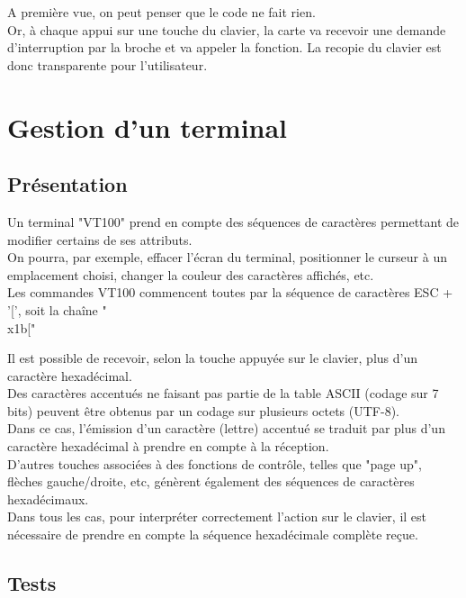 A première vue, on peut penser que le code ne fait rien.\\
Or, à chaque appui sur une touche du clavier, la carte va recevoir une demande d'interruption par la broche  et va appeler la fonction. La recopie du clavier est donc transparente pour l'utilisateur.

\chapter{Gestion d'un terminal}

\section{Présentation}

Un terminal "VT100" prend en compte des séquences de caractères permettant de modifier certains de ses attributs.\\
On pourra, par exemple, effacer l'écran du terminal, positionner le curseur à un emplacement choisi, changer la couleur des caractères affichés, etc.\\
Les commandes VT100 commencent toutes par la séquence de caractères ESC + '[', soit la chaîne "\\x1b["

Il est possible de recevoir, selon la touche appuyée sur le clavier, plus d'un caractère hexadécimal.\\
Des caractères accentués ne faisant pas partie de la table ASCII (codage sur 7 bits) peuvent être obtenus par un codage sur plusieurs octets (UTF-8).\\
Dans ce cas, l'émission d'un caractère (lettre) accentué se traduit par plus d'un caractère hexadécimal à prendre en compte à la réception.\\
D'autres touches associées à des fonctions de contrôle, telles que "page up", flèches gauche/droite, etc, génèrent également des séquences de caractères hexadécimaux.\\
Dans tous les cas, pour interpréter correctement l'action sur le clavier, il est nécessaire de prendre en compte la séquence hexadécimale complète reçue.

\section{Tests}

